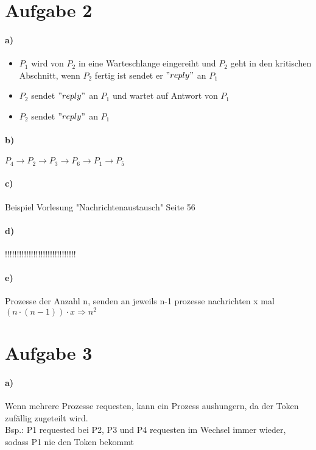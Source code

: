 \documentclass{scrartcl}
\begin{document}
		
		
		\section*{Aufgabe 2}
			\paragraph*{a)}
				\begin{itemize}
					\item $P_1$ wird von $P_2$ in eine Warteschlange eingereiht und $P_2$ geht in den kritischen Abschnitt, wenn $P_2$ fertig ist sendet er $"reply"$ an $P_1$
					\item $P_2$ sendet $"reply"$ an $P_1$ und wartet auf Antwort von $P_1$
					\item $P_2$ sendet $"reply"$ an $P_1$
				\end{itemize}
			
			\paragraph*{b)}
			$P_4 \rightarrow P_2 \rightarrow P_3 \rightarrow P_6 \rightarrow P_1 \rightarrow P_5$
			
			\paragraph*{c)}
			Beispiel Vorlesung "Nachrichtenaustausch" Seite 56
			
			\paragraph*{d)}
			!!!!!!!!!!!!!!!!!!!!!!!!!!!!!!
			
			\paragraph*{e)}
			Prozesse der Anzahl n, senden an jeweils n-1 prozesse nachrichten x mal\\
			$(n \cdot (n-1)) \cdot x \Rightarrow n^2$
			
			
		\section*{Aufgabe 3}
			\paragraph*{a)}
				Wenn mehrere Prozesse requesten, kann ein Prozess aushungern, da der Token zufällig zugeteilt wird.\\
				Bsp.: P1 requested bei P2, P3 und P4 requesten im Wechsel immer wieder, sodass P1 nie den Token bekommt
	
\end{document}

